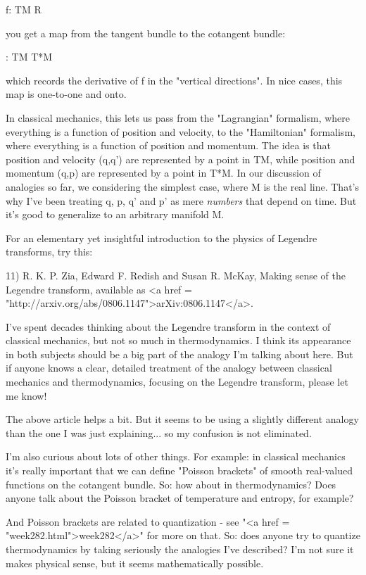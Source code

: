 f: TM \to  R

you get a map from the tangent bundle to the cotangent bundle:

\lambda : TM \to  T*M

which records the derivative of f in the "vertical directions".
In nice cases, this map \lambda  is one-to-one and onto.

In classical mechanics, this lets us pass from the "Lagrangian"
formalism, where everything is a function of position and velocity, to
the "Hamiltonian" formalism, where everything is a function of
position and momentum.  The idea is that position and velocity (q,q')
are represented by a point in TM, while position and momentum (q,p)
are represented by a point in T*M.  In our discussion of analogies so
far, we considering the simplest case, where M is the real line.
That's why I've been treating q, p, q' and p' as mere \emph{numbers} that
depend on time.  But it's good to generalize to an arbitrary manifold M.

For an elementary yet insightful introduction to the physics of Legendre
transforms, try this:

11) R. K. P. Zia, Edward F. Redish and Susan R. McKay, Making sense of
the Legendre transform, available as <a href =
"http://arxiv.org/abs/0806.1147">arXiv:0806.1147</a>.


I've spent decades thinking about the Legendre transform in the
context of classical mechanics, but not so much in thermodynamics.  I
think its appearance in both subjects should be a big part of the
analogy I'm talking about here.  But if anyone knows a clear, detailed
treatment of the analogy between classical mechanics and
thermodynamics, focusing on the Legendre transform, please let me
know!

The above article helps a bit.  But it seems to be using a slightly
different analogy than the one I was just explaining... so my
confusion is not eliminated.

I'm also curious about lots of other things.  For example: in
classical mechanics it's really important that we can define 
"Poisson brackets" of smooth real-valued functions 
on the cotangent bundle.  So: how about in thermodynamics?  
Does anyone talk about the Poisson bracket of temperature and 
entropy, for example?

And Poisson brackets are related to quantization - see "<a href =
"week282.html">week282</a>" for more on that.  So: does anyone
try to quantize thermodynamics by taking seriously the analogies I've
described?  I'm not sure it makes physical sense, but it seems
mathematically possible.


